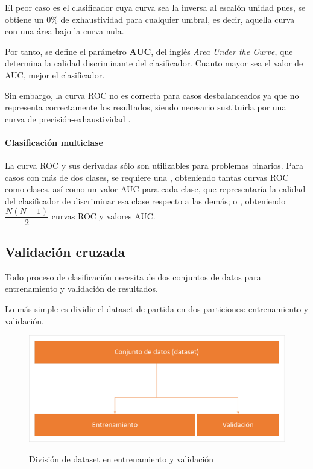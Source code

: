 El peor caso es el clasificador cuya curva sea la inversa al escalón unidad pues, se obtiene un 0\% de exhaustividad para cualquier umbral, es decir, aquella curva con una área bajo la curva nula.

Por tanto, se define el parámetro \textbf{AUC}, del inglés \textit{Area Under the Curve}, que determina la calidad discriminante del clasificador. Cuanto mayor sea el valor de AUC, mejor el clasificador.

Sin embargo, la curva ROC no es correcta para casos desbalanceados ya que no representa correctamente los resultados, siendo necesario sustituirla por una curva de precisión-exhaustividad \cite{10.1371/journal.pone.0118432}. 

\paragraph{Clasificación multiclase} La curva ROC y sus derivadas sólo son utilizables para problemas binarios. Para casos con más de dos clases, se requiere una , obteniendo tantas curvas ROC como clases, así como un valor AUC para cada clase, que representaría la calidad del clasificador de discriminar esa clase respecto a las demás; o , obteniendo $\dfrac{N(N-1)}{2}$ curvas ROC y valores AUC.

\subsection{Validación cruzada}

Todo proceso de clasificación necesita de dos conjuntos de datos para entrenamiento y validación de resultados.

Lo más simple es dividir el dataset de partida en dos particiones: entrenamiento y validación.

\begin{figure}[h]
	\centering
	\captionsetup{justification=centering}
	\includegraphics[width=\textwidth]{imagenes/marco_teorico/CV/train_test_split.pdf}
	\label{fig:CV_train_test_split}
	\caption{División de dataset en entrenamiento y validación}
\end{figure}

